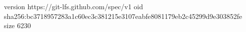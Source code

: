 version https://git-lfs.github.com/spec/v1
oid sha256:bc3718957283a1c60ec3c381215e3107eabfe8081179eb2c45299d9e303852fe
size 6230
